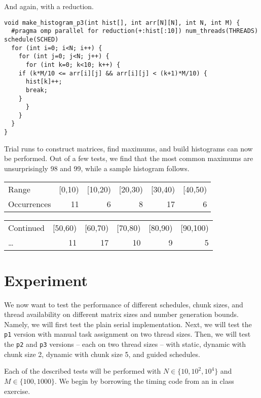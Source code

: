 \documentclass[11pt]{article}
\begin{document}
And again, with a reduction.

\begin{verbatim}
void make_histogram_p3(int hist[], int arr[N][N], int N, int M) {
  #pragma omp parallel for reduction(+:hist[:10]) num_threads(THREADS) schedule(SCHED)
  for (int i=0; i<N; i++) {
    for (int j=0; j<N; j++) {
      for (int k=0; k<10; k++) {
	if (k*M/10 <= arr[i][j] && arr[i][j] < (k+1)*M/10) {
	  hist[k]++;
	  break;
	}
      }
    }
  }
}
\end{verbatim}

Trial runs to construct matrices, find maximums, and build histograms
can now be performed. Out of a few tests, we find that the most common
maximums are unsurprisingly 98 and 99, while a sample histogram
follows.

\begin{center}
\begin{tabular}{lrrrrr}
Range & [0,10) & [10,20) & [20,30) & [30,40) & [40,50)\\
Occurrences & 11 & 6 & 8 & 17 & 6\\
\end{tabular}
\end{center}

\begin{center}
\begin{tabular}{lrrrrr}
Continued & [50,60) & [60,70) & [70,80) & [80,90) & [90,100)\\
\ldots{} & 11 & 17 & 10 & 9 & 5\\
\end{tabular}
\end{center}


\section{Experiment}
\label{sec-4}

We now want to test the performance of different schedules, chunk
sizes, and thread availability on different matrix sizes and number
generation bounds. Namely, we will first test the plain serial
implementation. Next, we will test the \verb~p1~ version with manual task
assignment on two thread sizes. Then, we will test the \verb~p2~ and \verb~p3~
versions -- each on two thread sizes -- with static, dynamic with
chunk size 2, dynamic with chunk size 5, and guided schedules.

Each of the described tests will be performed with $N \in \{10, 10^2,
10^4\}$ and $M \in \{100, 1000\}$. We begin by borrowing the timing
code from an in class exercise.
\end{document}

